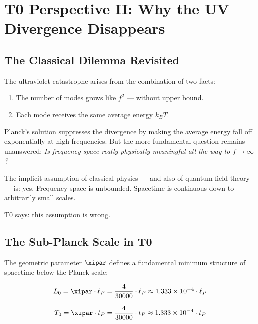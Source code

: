 \clearpage

\section{T0 Perspective II: Why the UV Divergence Disappears}
\label{sec:t0_uv}

\subsection{The Classical Dilemma Revisited}

The ultraviolet catastrophe arises from the combination of two facts:
\begin{enumerate}
    \item The number of modes grows like $f^2$ — without upper bound.
    \item Each mode receives the same average energy $k_BT$.
\end{enumerate}

Planck's solution suppresses the divergence by making the average energy fall off 
exponentially at high frequencies. But the more fundamental question remains 
unanswered: \emph{Is frequency space really physically meaningful all the way to 
$f \to \infty$?}

The implicit assumption of classical physics — and also of quantum field theory — 
is: yes. Frequency space is unbounded. Spacetime is continuous down to arbitrarily 
small scales.

T0 says: this assumption is wrong.

\subsection{The Sub-Planck Scale in T0}

The geometric parameter $\xipar$ defines a fundamental minimum structure of spacetime 
below the Planck scale:

\begin{equation}
    L_0 = \xipar \cdot \ell_P = \frac{4}{30000} \cdot \ell_P \approx 1.333 \times 10^{-4} \cdot \ell_P
    \label{eq:subplanck_length}
\end{equation}

\begin{equation}
    T_0 = \xipar \cdot t_P = \frac{4}{30000} \cdot t_P \approx 1.333 \times 10^{-4} \cdot t_P
    \label{eq:subplanck_time}
\end{equation}

